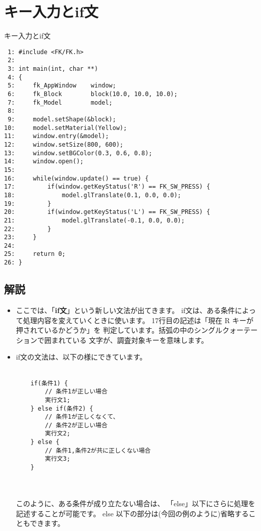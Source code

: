 \section{キー入力とif文} \label{sec:03-key}
\begin{itembox}[l]{キー入力とif文}
\begin{verbatim}
 1: #include <FK/FK.h>
 2: 
 3: int main(int, char **)
 4: {
 5:     fk_AppWindow    window;
 6:     fk_Block        block(10.0, 10.0, 10.0);
 7:     fk_Model        model;
 8: 
 9:     model.setShape(&block);
10:     model.setMaterial(Yellow);
11:     window.entry(&model);
12:     window.setSize(800, 600);
13:     window.setBGColor(0.3, 0.6, 0.8);
14:     window.open();
15: 
16:     while(window.update() == true) {
17:         if(window.getKeyStatus('R') == FK_SW_PRESS) {
18:             model.glTranslate(0.1, 0.0, 0.0);
19:         }
20:         if(window.getKeyStatus('L') == FK_SW_PRESS) {
21:             model.glTranslate(-0.1, 0.0, 0.0);
22:         } 
23:     }
24: 
25:     return 0;
26: }
\end{verbatim}
\end{itembox}

\subsection*{解説}
\begin{itemize}
 \item ここでは、「\textbf{if文}」という新しい文法が出てきます。
	if文は、ある条件によって処理内容を変えていくときに使います。
	17行目の記述は「現在 R キーが押されているかどうか」を
	判定しています。括弧の中のシングルクォーテーションで囲まれている
	文字が、調査対象キーを意味します。

 \item if文の文法は、以下の様にできています。\\ ~ \\
	\begin{shadebox}
	\begin{verbatim}
	if(条件1) {
	    // 条件1が正しい場合
	    実行文1;
	} else if(条件2) {
	    // 条件1が正しくなくて、
	    // 条件2が正しい場合
	    実行文2;
	} else {
	    // 条件1,条件2が共に正しくない場合
	    実行文3;
	}
	\end{verbatim}
	\end{shadebox} \\ ~ \\
	このように、ある条件が成り立たない場合は、
	「else」以下にさらに処理を記述することが可能です。
	else 以下の部分は(今回の例のように)省略することもできます。
\end{itemize}


